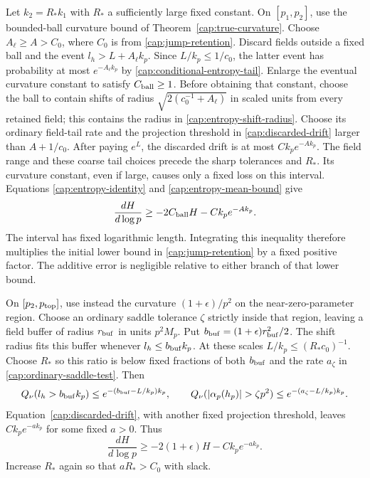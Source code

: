 Let $k_2=R_*k_1$ with $R_*$ a sufficiently large fixed constant. On
$[p_1,p_2]$, use the bounded-ball curvature bound of
Theorem~\ref{cap:true-curvature}. Choose $A_\ell\ge A>C_0$, where $C_0$ is
from \eqref{cap:jump-retention}. Discard fields outside a fixed ball and
the event $l_h>L+A_\ell k_p$. Since $L/k_p\le1/c_0$, the latter event has
probability at most $e^{-A_\ell k_p}$ by
\eqref{cap:conditional-entropy-tail}. Enlarge the eventual curvature
constant to satisfy $C_{\rm ball}\ge1$. Before obtaining that constant,
choose the ball to contain shifts of radius
$\sqrt{2(c_0^{-1}+A_\ell)}$ in scaled units from every retained field;
this contains the radius in \eqref{cap:entropy-shift-radius}.
Choose its ordinary field-tail rate and the projection threshold in
\eqref{cap:discarded-drift} larger than $A+1/c_0$.
After paying $e^L$, the discarded drift is at most $Ck_pe^{-Ak_p}$.
The field range and these coarse tail choices precede the sharp tolerances
and $R_*$. Its curvature constant, even if large, causes only a fixed loss
on this interval. Equations \eqref{cap:entropy-identity} and
\eqref{cap:entropy-mean-bound} give
\[
 \frac{dH}{d\log p}\ge-2C_{\rm ball}H-Ck_pe^{-Ak_p}.
\]
The interval has fixed logarithmic length. Integrating this inequality
therefore multiplies the initial lower bound in \eqref{cap:jump-retention} by
a fixed positive factor. The additive error is negligible relative to either
branch of that lower bound.

On $[p_2,p_{\rm top}]$, use instead the curvature $(1+\epsilon)/p^2$ on the
near-zero-parameter region. Choose an ordinary saddle tolerance $\zeta$
strictly inside that region, leaving a field buffer of radius
$r_{\rm buf}$ in units $p^2M_p$. Put
$b_{\rm buf}=(1+\epsilon)r_{\rm buf}^2/2$. The shift radius fits this
buffer whenever $l_h\le b_{\rm buf}k_p$. At these scales
$L/k_p\le(R_*c_0)^{-1}$. Choose $R_*$ so this ratio is below fixed
fractions of both $b_{\rm buf}$ and the rate $a_\zeta$ in
\eqref{cap:ordinary-saddle-test}. Then
\[
 Q_\nu(l_h>b_{\rm buf}k_p)
 \le e^{-(b_{\rm buf}-L/k_p)k_p},\qquad
 Q_\nu(|\alpha_p(h_p)|>\zeta p^2)
 \le e^{-(a_\zeta-L/k_p)k_p}.
\]
Equation~\eqref{cap:discarded-drift}, with another fixed projection
threshold, leaves $Ck_pe^{-ak_p}$ for some fixed $a>0$. Thus
\[
 \frac{dH}{d\log p}\ge-2(1+\epsilon)H-Ck_pe^{-ak_p}.
\]
Increase $R_*$ again so that $aR_*>C_0$ with slack.

